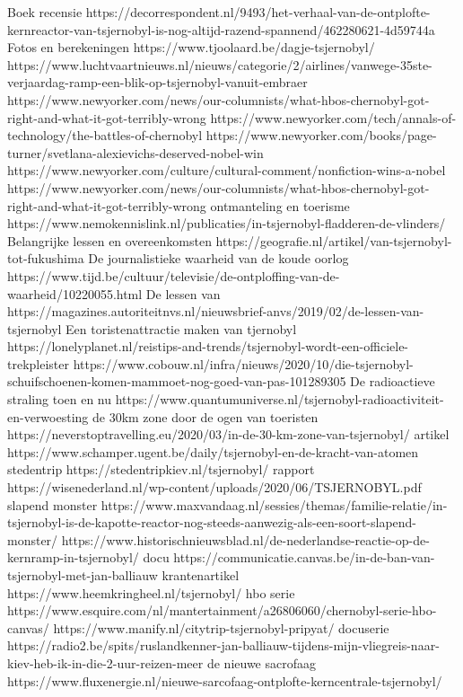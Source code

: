 Boek recensie
https://decorrespondent.nl/9493/het-verhaal-van-de-ontplofte-kernreactor-van-tsjernobyl-is-nog-altijd-razend-spannend/462280621-4d59744a
Fotos en berekeningen
https://www.tjoolaard.be/dagje-tsjernobyl/
https://www.luchtvaartnieuws.nl/nieuws/categorie/2/airlines/vanwege-35ste-verjaardag-ramp-een-blik-op-tsjernobyl-vanuit-embraer
https://www.newyorker.com/news/our-columnists/what-hbos-chernobyl-got-right-and-what-it-got-terribly-wrong
https://www.newyorker.com/tech/annals-of-technology/the-battles-of-chernobyl
https://www.newyorker.com/books/page-turner/svetlana-alexievichs-deserved-nobel-win
https://www.newyorker.com/culture/cultural-comment/nonfiction-wins-a-nobel
https://www.newyorker.com/news/our-columnists/what-hbos-chernobyl-got-right-and-what-it-got-terribly-wrong
ontmanteling en toerisme
https://www.nemokennislink.nl/publicaties/in-tsjernobyl-fladderen-de-vlinders/
Belangrijke lessen en overeenkomsten
https://geografie.nl/artikel/van-tsjernobyl-tot-fukushima
De journalistieke waarheid van de koude oorlog
https://www.tijd.be/cultuur/televisie/de-ontploffing-van-de-waarheid/10220055.html
De lessen van
https://magazines.autoriteitnvs.nl/nieuwsbrief-anvs/2019/02/de-lessen-van-tsjernobyl
Een toristenattractie maken van tjernobyl
https://lonelyplanet.nl/reistips-and-trends/tsjernobyl-wordt-een-officiele-trekpleister
https://www.cobouw.nl/infra/nieuws/2020/10/die-tsjernobyl-schuifschoenen-komen-mammoet-nog-goed-van-pas-101289305
De radioactieve straling toen en nu
https://www.quantumuniverse.nl/tsjernobyl-radioactiviteit-en-verwoesting
de 30km zone door de ogen van toeristen
https://neverstoptravelling.eu/2020/03/in-de-30-km-zone-van-tsjernobyl/
artikel
https://www.schamper.ugent.be/daily/tsjernobyl-en-de-kracht-van-atomen
stedentrip
https://stedentripkiev.nl/tsjernobyl/
rapport
https://wisenederland.nl/wp-content/uploads/2020/06/TSJERNOBYL.pdf
slapend monster
https://www.maxvandaag.nl/sessies/themas/familie-relatie/in-tsjernobyl-is-de-kapotte-reactor-nog-steeds-aanwezig-als-een-soort-slapend-monster/
https://www.historischnieuwsblad.nl/de-nederlandse-reactie-op-de-kernramp-in-tsjernobyl/
docu
https://communicatie.canvas.be/in-de-ban-van-tsjernobyl-met-jan-balliauw
krantenartikel
https://www.heemkringheel.nl/tsjernobyl/
hbo serie
https://www.esquire.com/nl/mantertainment/a26806060/chernobyl-serie-hbo-canvas/
https://www.manify.nl/citytrip-tsjernobyl-pripyat/
docuserie
https://radio2.be/spits/ruslandkenner-jan-balliauw-tijdens-mijn-vliegreis-naar-kiev-heb-ik-in-die-2-uur-reizen-meer
de  nieuwe sacrofaag
https://www.fluxenergie.nl/nieuwe-sarcofaag-ontplofte-kerncentrale-tsjernobyl/
